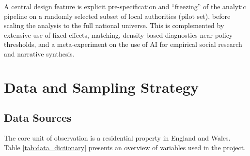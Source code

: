 \documentclass[12pt]{article}
\begin{document}
A central design feature is explicit pre-specification and ``freezing'' of the analytic pipeline on a randomly selected subset of local authorities (pilot set), before scaling the analysis to the full national universe. This is complemented by extensive use of fixed effects, matching, density-based diagnostics near policy thresholds, and a meta-experiment on the use of AI for empirical social research and narrative synthesis.

\section{Data and Sampling Strategy}

\subsection{Data Sources}
The core unit of observation is a residential property in England and Wales. Table \ref{tab:data_dictionary} presents an overview of variables used in the project.
\end{document}
